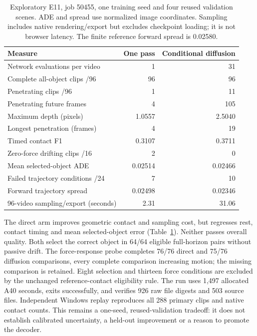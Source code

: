 \documentclass[11pt,a4paper]{article}
\begin{document}
\begin{table}[!ht]
\centering
\small
\begin{tabular}{lrr}
\hline
Measure & One pass & Conditional diffusion \\
\hline
Network evaluations per video & 1 & 31 \\
Complete all-object clips /96 & 96 & 96 \\
Penetrating clips /96 & 1 & 11 \\
Penetrating future frames & 4 & 105 \\
Maximum depth (pixels) & 1.0557 & 2.5040 \\
Longest penetration (frames) & 4 & 19 \\
Timed contact F1 & 0.3107 & 0.3711 \\
Zero-force drifting clips /16 & 2 & 0 \\
Mean selected-object ADE & 0.02514 & 0.02466 \\
Failed trajectory conditions /24 & 7 & 10 \\
Forward trajectory spread & 0.02498 & 0.02346 \\
96-video sampling/export (seconds) & 2.31 & 31.06 \\
\hline
\end{tabular}
\caption{Exploratory E11, job 50455, one training seed and four reused validation
scenes. ADE and spread use normalized image coordinates. Sampling includes
native rendering/export but excludes checkpoint loading; it is not browser
latency. The finite reference forward spread is 0.02580.}
\label{tab:prior}
\end{table}

The direct arm improves geometric contact and sampling cost, but regresses
rest, contact timing and mean selected-object error (Table~\ref{tab:prior}).
Neither passes overall quality. Both select the correct object in 64/64 eligible
full-horizon pairs without passive drift. The force-response probe completes 76/76 direct
and 75/76 diffusion comparisons, every complete comparison increasing motion;
the missing comparison is retained. Eight selection and thirteen force
conditions are excluded by the unchanged reference-contact eligibility rule.
The run uses 1,497 allocated A40 seconds, exits successfully, and verifies 926
raw file digests and 503 source files. Independent Windows replay reproduces all
288 primary clips and native contact counts. This remains a one-seed,
reused-validation tradeoff: it does not establish calibrated uncertainty, a
held-out improvement or a reason to promote the decoder.
\end{document}
